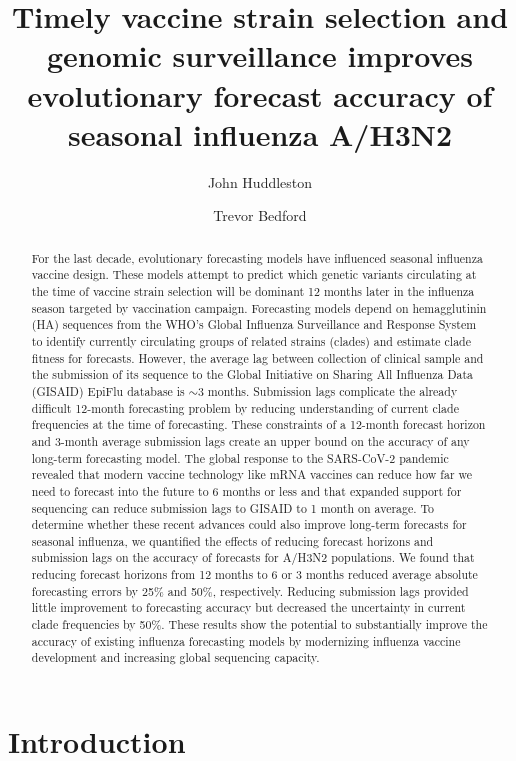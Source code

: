 \documentclass[9pt,lineno]{elife}
\title{Timely vaccine strain selection and genomic surveillance improves evolutionary forecast accuracy of seasonal influenza A/H3N2}
\author[1*]{John Huddleston}
\author[1,2]{Trevor Bedford}
\affil[1]{Vaccine and Infectious Disease Division, Fred Hutchinson Cancer Center, Seattle, WA, USA}
\affil[2]{Howard Hughes Medical Institute, Seattle, WA, USA}
\begin{document}
\maketitle

\begin{abstract}
For the last decade, evolutionary forecasting models have influenced seasonal influenza vaccine design.
These models attempt to predict which genetic variants circulating at the time of vaccine strain selection will be dominant 12 months later in the influenza season targeted by vaccination campaign.
Forecasting models depend on hemagglutinin (HA) sequences from the WHO’s Global Influenza Surveillance and Response System to identify currently circulating groups of related strains (clades) and estimate clade fitness for forecasts.
However, the average lag between collection of clinical sample and the submission of its sequence to the Global Initiative on Sharing All Influenza Data (GISAID) EpiFlu database is $\sim$3 months.
Submission lags complicate the already difficult 12-month forecasting problem by reducing understanding of current clade frequencies at the time of forecasting.
These constraints of a 12-month forecast horizon and 3-month average submission lags create an upper bound on the accuracy of any long-term forecasting model.
The global response to the SARS-CoV-2 pandemic revealed that modern vaccine technology like mRNA vaccines can reduce how far we need to forecast into the future to 6 months or less and that expanded support for sequencing can reduce submission lags to GISAID to 1 month on average.
To determine whether these recent advances could also improve long-term forecasts for seasonal influenza, we quantified the effects of reducing forecast horizons and submission lags on the accuracy of forecasts for A/H3N2 populations.
We found that reducing forecast horizons from 12 months to 6 or 3 months reduced average absolute forecasting errors by 25\% and 50\%, respectively.
Reducing submission lags provided little improvement to forecasting accuracy but decreased the uncertainty in current clade frequencies by 50\%.
These results show the potential to substantially improve the accuracy of existing influenza forecasting models by modernizing influenza vaccine development and increasing global sequencing capacity.
\end{abstract}

\section{Introduction}
\end{document}
